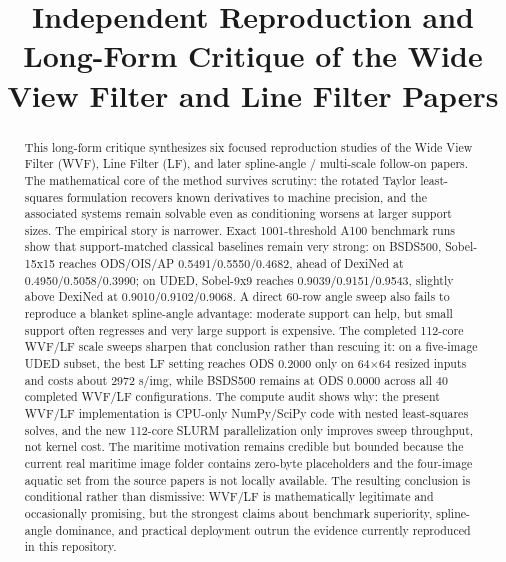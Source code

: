 \documentclass[conference]{IEEEtran}
\begin{document}
\title{Independent Reproduction and Long-Form Critique of the Wide View Filter and Line Filter Papers}

\author{
}

\maketitle

\begin{abstract}
This long-form critique synthesizes six focused reproduction studies of the Wide View Filter (WVF), Line Filter (LF), and later spline-angle / multi-scale follow-on papers. The mathematical core of the method survives scrutiny: the rotated Taylor least-squares formulation recovers known derivatives to machine precision, and the associated systems remain solvable even as conditioning worsens at larger support sizes. The empirical story is narrower. Exact 1001-threshold A100 benchmark runs show that support-matched classical baselines remain very strong: on BSDS500, Sobel-15x15 reaches ODS/OIS/AP 0.5491/0.5550/0.4682, ahead of DexiNed at 0.4950/0.5058/0.3990; on UDED, Sobel-9x9 reaches 0.9039/0.9151/0.9543, slightly above DexiNed at 0.9010/0.9102/0.9068. A direct 60-row angle sweep also fails to reproduce a blanket spline-angle advantage: moderate support can help, but small support often regresses and very large support is expensive. The completed 112-core WVF/LF scale sweeps sharpen that conclusion rather than rescuing it: on a five-image UDED subset, the best LF setting reaches ODS 0.2000 only on 64$\times$64 resized inputs and costs about 2972 s/img, while BSDS500 remains at ODS 0.0000 across all 40 completed WVF/LF configurations. The compute audit shows why: the present WVF/LF implementation is CPU-only NumPy/SciPy code with nested least-squares solves, and the new 112-core SLURM parallelization only improves sweep throughput, not kernel cost. The maritime motivation remains credible but bounded because the current real maritime image folder contains zero-byte placeholders and the four-image aquatic set from the source papers is not locally available. The resulting conclusion is conditional rather than dismissive: WVF/LF is mathematically legitimate and occasionally promising, but the strongest claims about benchmark superiority, spline-angle dominance, and practical deployment outrun the evidence currently reproduced in this repository.
\end{abstract}
\end{document}
